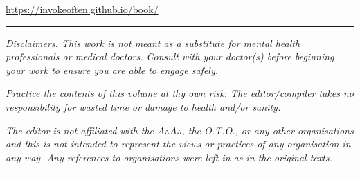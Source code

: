 {\begin{center}\url{https://invokeoften.github.io/book/}\end{center}

\begin{center}
  \rule{1in}{0.5pt}
\end{center}


\textit{Disclaimers. This work is not meant as a substitute for mental health professionals or medical doctors. Consult with your doctor(s) before beginning your work to ensure you are able to engage safely.}

\textit{Practice the contents of this volume at thy own risk. The editor/compiler takes no responsibility for wasted time or damage to health and/or sanity.}

\textit{The editor is not affiliated with the $A{\therefore}A{\therefore}$, the O.T.O., or any other organisations and this is not intended to represent the views or practices of any organisation in any way. Any references to organisations were left in as in the original texts.}

\begin{center}
  \rule{1in}{0.5pt}
\end{center}
\vspace*{\fill}
}

